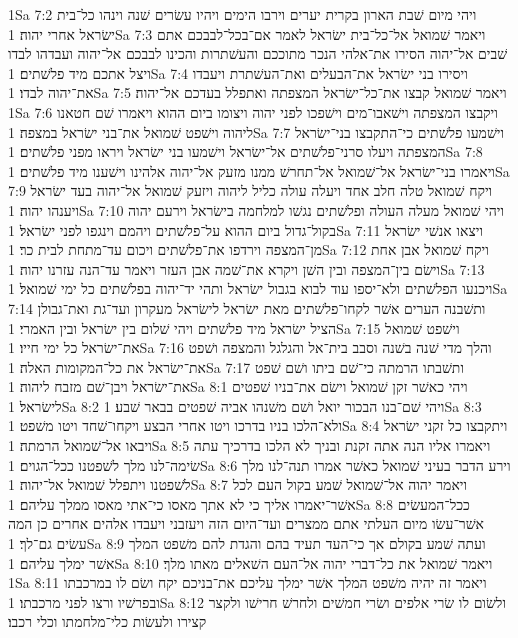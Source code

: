 1Sa 7:2  ויהי מיום שׁבת הארון בקרית יערים וירבו הימים ויהיו עשׂרים שׁנה וינהו כל־בית ישׂראל אחרי יהוה׃
1Sa 7:3  ויאמר שׁמואל אל־כל־בית ישׂראל לאמר אם־בכל־לבבכם אתם שׁבים אל־יהוה הסירו את־אלהי הנכר מתוככם והעשׁתרות והכינו לבבכם אל־יהוה ועבדהו לבדו ויצל אתכם מיד פלשׁתים׃
1Sa 7:4  ויסירו בני ישׂראל את־הבעלים ואת־העשׁתרת ויעבדו את־יהוה לבדו׃
1Sa 7:5  ויאמר שׁמואל קבצו את־כל־ישׂראל המצפתה ואתפלל בעדכם אל־יהוה׃
1Sa 7:6  ויקבצו המצפתה וישׁאבו־מים וישׁפכו לפני יהוה ויצומו ביום ההוא ויאמרו שׁם חטאנו ליהוה וישׁפט שׁמואל את־בני ישׂראל במצפה׃
1Sa 7:7  וישׁמעו פלשׁתים כי־התקבצו בני־ישׂראל המצפתה ויעלו סרני־פלשׁתים אל־ישׂראל וישׁמעו בני ישׂראל ויראו מפני פלשׁתים׃
1Sa 7:8  ויאמרו בני־ישׂראל אל־שׁמואל אל־תחרשׁ ממנו מזעק אל־יהוה אלהינו וישׁענו מיד פלשׁתים׃
1Sa 7:9  ויקח שׁמואל טלה חלב אחד ויעלה עולה כליל ליהוה ויזעק שׁמואל אל־יהוה בעד ישׂראל ויענהו יהוה׃
1Sa 7:10  ויהי שׁמואל מעלה העולה ופלשׁתים נגשׁו למלחמה בישׂראל וירעם יהוה בקול־גדול ביום ההוא על־פלשׁתים ויהמם וינגפו לפני ישׂראל׃
1Sa 7:11  ויצאו אנשׁי ישׂראל מן־המצפה וירדפו את־פלשׁתים ויכום עד־מתחת לבית כר׃
1Sa 7:12  ויקח שׁמואל אבן אחת וישׂם בין־המצפה ובין השׁן ויקרא את־שׁמה אבן העזר ויאמר עד־הנה עזרנו יהוה׃
1Sa 7:13  ויכנעו הפלשׁתים ולא־יספו עוד לבוא בגבול ישׂראל ותהי יד־יהוה בפלשׁתים כל ימי שׁמואל׃
1Sa 7:14  ותשׁבנה הערים אשׁר לקחו־פלשׁתים מאת ישׂראל לישׂראל מעקרון ועד־גת ואת־גבולן הציל ישׂראל מיד פלשׁתים ויהי שׁלום בין ישׂראל ובין האמרי׃
1Sa 7:15  וישׁפט שׁמואל את־ישׂראל כל ימי חייו׃
1Sa 7:16  והלך מדי שׁנה בשׁנה וסבב בית־אל והגלגל והמצפה ושׁפט את־ישׂראל את כל־המקומות האלה׃
1Sa 7:17  ותשׁבתו הרמתה כי־שׁם ביתו ושׁם שׁפט את־ישׂראל ויבן־שׁם מזבח ליהוה׃
1Sa 8:1  ויהי כאשׁר זקן שׁמואל וישׂם את־בניו שׁפטים לישׂראל׃
1Sa 8:2  ויהי שׁם־בנו הבכור יואל ושׁם משׁנהו אביה שׁפטים בבאר שׁבע׃
1Sa 8:3  ולא־הלכו בניו בדרכו ויטו אחרי הבצע ויקחו־שׁחד ויטו משׁפט׃
1Sa 8:4  ויתקבצו כל זקני ישׂראל ויבאו אל־שׁמואל הרמתה׃
1Sa 8:5  ויאמרו אליו הנה אתה זקנת ובניך לא הלכו בדרכיך עתה שׂימה־לנו מלך לשׁפטנו ככל־הגוים׃
1Sa 8:6  וירע הדבר בעיני שׁמואל כאשׁר אמרו תנה־לנו מלך לשׁפטנו ויתפלל שׁמואל אל־יהוה׃
1Sa 8:7  ויאמר יהוה אל־שׁמואל שׁמע בקול העם לכל אשׁר־יאמרו אליך כי לא אתך מאסו כי־אתי מאסו ממלך עליהם׃
1Sa 8:8  ככל־המעשׂים אשׁר־עשׂו מיום העלתי אתם ממצרים ועד־היום הזה ויעזבני ויעבדו אלהים אחרים כן המה עשׂים גם־לך׃
1Sa 8:9  ועתה שׁמע בקולם אך כי־העד תעיד בהם והגדת להם משׁפט המלך אשׁר ימלך עליהם׃
1Sa 8:10  ויאמר שׁמואל את כל־דברי יהוה אל־העם השׁאלים מאתו מלך׃
1Sa 8:11  ויאמר זה יהיה משׁפט המלך אשׁר ימלך עליכם את־בניכם יקח ושׂם לו במרכבתו ובפרשׁיו ורצו לפני מרכבתו׃
1Sa 8:12  ולשׂום לו שׂרי אלפים ושׂרי חמשׁים ולחרשׁ חרישׁו ולקצר קצירו ולעשׂות כלי־מלחמתו וכלי רכבו׃
